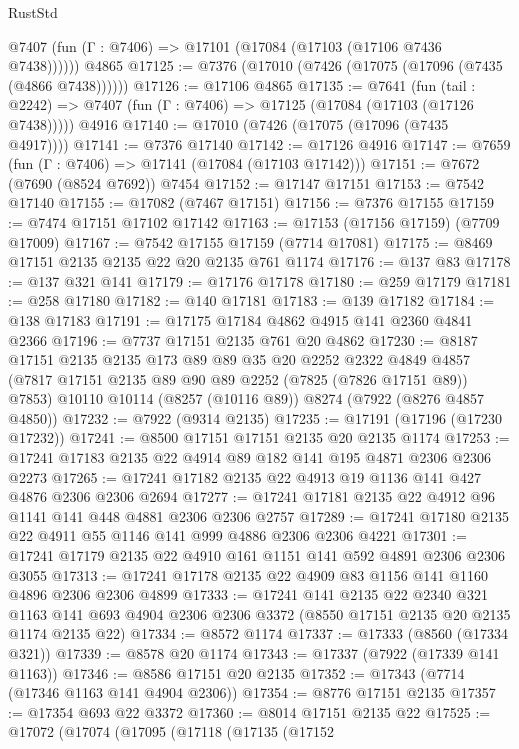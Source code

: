 \begin{lexlean}{RustStd}
\begin{coremodule}
      @7407 (fun (Γ : @7406) => @17101 (@17084 (@17103 (@17106 @7436 @7438))))))
    @4865
@17125 := @7376 (@17010 (@7426 (@17075 (@17096 (@7435 (@4866 @7438))))))
@17126 := @17106 @4865
@17135 := @7641
    (fun (tail : @2242) => @7407 (fun (Γ : @7406) => @17125 (@17084 (@17103 (@17126 @7438)))))
    @4916
@17140 := @17010 (@7426 (@17075 (@17096 (@7435 @4917))))
@17141 := @7376 @17140
@17142 := @17126 @4916
@17147 := @7659 (fun (Γ : @7406) => @17141 (@17084 (@17103 @17142)))
@17151 := @7672 (@7690 (@8524 @7692)) @7454
@17152 := @17147 @17151
@17153 := @7542 @17140
@17155 := @17082 (@7467 @17151)
@17156 := @7376 @17155
@17159 := @7474 @17151 @17102 @17142
@17163 := @17153 (@17156 @17159) (@7709 @17009)
@17167 := @7542 @17155 @17159 (@7714 @17081)
@17175 := @8469 @17151 @2135 @2135 @22 @20 @2135 @761 @1174
@17176 := @137 @83
@17178 := @137 @321 @141
@17179 := @17176 @17178
@17180 := @259 @17179
@17181 := @258 @17180
@17182 := @140 @17181
@17183 := @139 @17182
@17184 := @138 @17183
@17191 := @17175 @17184 @4862 @4915 @141 @2360 @4841 @2366
@17196 := @7737 @17151 @2135 @761 @20 @4862
@17230 := @8187
    @17151
    @2135
    @2135
    @173
    @89
    @89
    @35
    @20
    @2252
    @2322
    @4849
    @4857
    (@7817 @17151 @2135 @89 @90 @89 @2252 (@7825 (@7826 @17151 @89)) @7853)
    @10110
    @10114
    (@8257 (@10116 @89))
    @8274
    (@7922 (@8276 @4857 @4850))
@17232 := @7922 (@9314 @2135)
@17235 := @17191 (@17196 (@17230 @17232))
@17241 := @8500 @17151 @17151 @2135 @20 @2135 @1174
@17253 := @17241 @17183 @2135 @22 @4914 @89 @182 @141 @195 @4871 @2306 @2306 @2273
@17265 := @17241 @17182 @2135 @22 @4913 @19 @1136 @141 @427 @4876 @2306 @2306 @2694
@17277 := @17241 @17181 @2135 @22 @4912 @96 @1141 @141 @448 @4881 @2306 @2306 @2757
@17289 := @17241 @17180 @2135 @22 @4911 @55 @1146 @141 @999 @4886 @2306 @2306 @4221
@17301 := @17241 @17179 @2135 @22 @4910 @161 @1151 @141 @592 @4891 @2306 @2306 @3055
@17313 := @17241 @17178 @2135 @22 @4909 @83 @1156 @141 @1160 @4896 @2306 @2306 @4899
@17333 := @17241
    @141
    @2135
    @22
    @2340
    @321
    @1163
    @141
    @693
    @4904
    @2306
    @2306
    @3372
    (@8550 @17151 @2135 @20 @2135 @1174 @2135 @22)
@17334 := @8572 @1174
@17337 := @17333 (@8560 (@17334 @321))
@17339 := @8578 @20 @1174
@17343 := @17337 (@7922 (@17339 @141 @1163))
@17346 := @8586 @17151 @20 @2135
@17352 := @17343 (@7714 (@17346 @1163 @141 @4904 @2306))
@17354 := @8776 @17151 @2135
@17357 := @17354 @693 @22 @3372
@17360 := @8014 @17151 @2135 @22
@17525 := @17072
    (@17074
      (@17095
        (@17118
          (@17135
            (@17152

\end{coremodule}
\end{lexlean}
